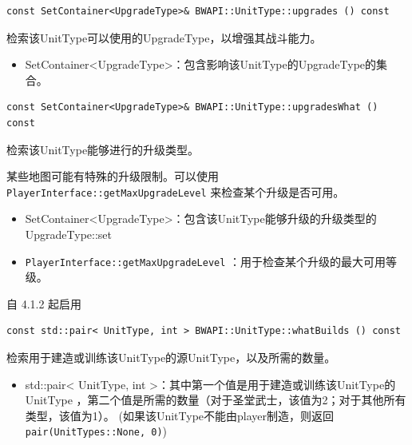 \begin{tcolorbox}[colback=white, colframe=black!60!white, title=upgrades(), arc=0mm]
    \begin{verbatim}
const SetContainer<UpgradeType>& BWAPI::UnitType::upgrades () const
    \end{verbatim}
    检索该UnitType可以使用的UpgradeType，以增强其战斗能力。
    \begin{return}
        \begin{itemize}
            \item SetContainer<UpgradeType>：包含影响该UnitType的UpgradeType的集合。
        \end{itemize}
    \end{return}
\end{tcolorbox}


\begin{tcolorbox}[colback=white, colframe=black!60!white, title=upgradesWhat(), arc=0mm]
    \begin{verbatim}
const SetContainer<UpgradeType>& BWAPI::UnitType::upgradesWhat () const
    \end{verbatim}
    检索该UnitType能够进行的升级类型。
    \begin{note}
        某些地图可能有特殊的升级限制。可以使用   \verb|PlayerInterface::getMaxUpgradeLevel|   来检查某个升级是否可用。
    \end{note}
    \begin{return}
        \begin{itemize}
            \item SetContainer<UpgradeType>：包含该UnitType能够升级的升级类型的   UpgradeType::set
        \end{itemize}
    \end{return}
    \begin{refer}
        \begin{itemize}
            \item  \verb|PlayerInterface::getMaxUpgradeLevel|  ：用于检查某个升级的最大可用等级。
        \end{itemize}
    \end{refer}
    自 4.1.2 起启用
\end{tcolorbox}


\begin{tcolorbox}[colback=white, colframe=black!60!white, title=whatBuilds(), arc=0mm]
    \begin{verbatim}
const std::pair< UnitType, int > BWAPI::UnitType::whatBuilds () const
    \end{verbatim}
    检索用于建造或训练该UnitType的源UnitType，以及所需的数量。
    \begin{return}
        \begin{itemize}
            \item std::pair< UnitType, int >：其中第一个值是用于建造或训练该UnitType的   UnitType  ，第二个值是所需的数量（对于圣堂武士，该值为2；对于其他所有类型，该值为1）。
            (如果该UnitType不能由player制造，则返回\verb|pair(UnitTypes::None, 0)|)
            \end{itemize}
    \end{return}
\end{tcolorbox}


